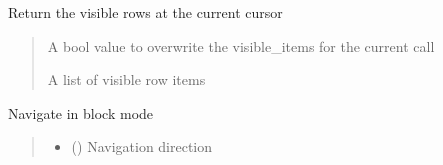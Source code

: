 \documentclass[letterpaper,10pt,english]{sphinxmanual}
\begin{document}
\begin{savenotes}
\begin{fulllineitems}
\begin{savenotes}\begin{fulllineitems}
\label{\detokenize{eezz:eezz.table.TTable.get_visible_rows}}
\pysigstartsignatures
{}
\pysigstopsignatures
\sphinxAtStartPar
Return the visible rows at the current cursor
\begin{quote}\begin{description}
\sphinxAtStartPar
{} \textendash{} A bool value to overwrite the visible\_items for the current call

\sphinxAtStartPar
A list of visible row items

\end{description}\end{quote}

\end{fulllineitems}\end{savenotes}


\begin{savenotes}\begin{fulllineitems}
\label{\detokenize{eezz:eezz.table.TTable.navigate}}
\pysigstartsignatures
{}
\pysigstopsignatures
\sphinxAtStartPar
Navigate in block mode
\begin{quote}\begin{description}
\begin{itemize}
\item {} 
\sphinxAtStartPar
{} ({\hyperref[\detokenize{eezz:eezz.table.TNavigation}]{}}) \textendash{} Navigation direction


\end{itemize}
\end{description}
\end{quote}
\end{fulllineitems}
\end{savenotes}
\end{fulllineitems}
\end{savenotes}
\end{document}
